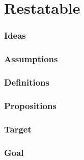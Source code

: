 \chapter{Restatable}
\label{cha:restatable}

\subsection*{Ideas}

\ideaUSE*

\ideaDefeatersForCS*

\ideaEIS*

\ideaDismissingDefeaters*

\ideaCSbyAR*

\ideaCSbyWR*

\subsection*{Assumptions}

\assuCSVP*

\assuCSRR*

\assuNFCS*

\assuEIS*

\assuCSbyPCS*

\assuCSPersists*

\assuDetachToClaim*

\subsection*{Definitions}


\expectationDef*









\subsection*{Propositions}

\propRecogniseDefeaters*

\propInfoToExpectation*

\propExpectNai*

\propScenariosExist*

\propAbilityExuastive*

\propNoESUandADB*

\propNI*


\subsection*{Target}

\targetESU*

\targeGESU*

\subsection*{Goal}

\goalEAS*

\ideaEASw*




